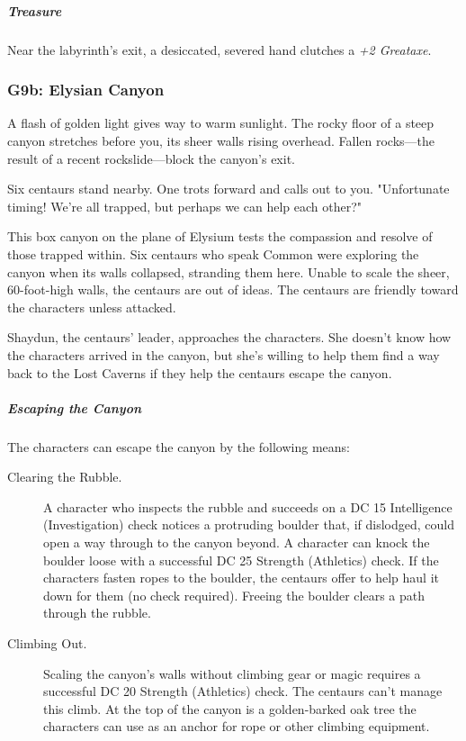 \documentclass[10pt,a4paper,twoside,bg=print,twocolumn,openany,nodeprecatedcode]{dndbook}
\begin{document}
\subparagraph{Treasure}
Near the labyrinth's exit, a desiccated, severed hand clutches a \textit{+2 Greataxe}.

\subsubsection{G9b: Elysian Canyon}
\begin{DndReadAloud}{}
A flash of golden light gives way to warm sunlight. The rocky floor of a steep canyon stretches before you, its sheer walls rising overhead. Fallen rocks—the result of a recent rockslide—block the canyon's exit.

Six centaurs stand nearby. One trots forward and calls out to you. "Unfortunate timing! We're all trapped, but perhaps we can help each other?"

\end{DndReadAloud}

This box canyon on the plane of Elysium tests the compassion and resolve of those trapped within. Six centaurs who speak Common were exploring the canyon when its walls collapsed, stranding them here. Unable to scale the sheer, 60-foot-high walls, the centaurs are out of ideas. The centaurs are friendly toward the characters unless attacked.

Shaydun, the centaurs' leader, approaches the characters. She doesn't know how the characters arrived in the canyon, but she's willing to help them find a way back to the Lost Caverns if they help the centaurs escape the canyon.

\subparagraph{Escaping the Canyon}
The characters can escape the canyon by the following means:


\begin{description}
\item[Clearing the Rubble.]
A character who inspects the rubble and succeeds on a DC 15 Intelligence (Investigation) check notices a protruding boulder that, if dislodged, could open a way through to the canyon beyond. A character can knock the boulder loose with a successful DC 25 Strength (Athletics) check. If the characters fasten ropes to the boulder, the centaurs offer to help haul it down for them (no check required). Freeing the boulder clears a path through the rubble.
\item[Climbing Out.]
Scaling the canyon's walls without climbing gear or magic requires a successful DC 20 Strength (Athletics) check. The centaurs can't manage this climb. At the top of the canyon is a golden-barked oak tree the characters can use as an anchor for rope or other climbing equipment.
\end{description}
\end{document}

